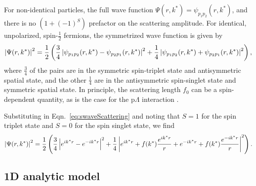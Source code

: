 For non-identical particles, the full wave function $\Psi(r,k^*) = \psi_{p_1p_2}(r,k^*)$, and there is no $(1 + (-1)^S)$ prefactor on the scattering amplitude. 
For identical, unpolarized, spin-$\frac{1}{2}$ fermions, the symmetrized wave function is given by 
\begin{equation}
\label{eq:SymmetrizedWaveFunction}
\left\lvert\Psi(r,k^*)\right\rvert^2 = \frac{1}{2}\left(\frac{3}{4} \left\lvert\psi_{p_1p_2}(r,k^*) - \psi_{p_2p_1}(r,k^*)\right\rvert^2
+ \frac{1}{4} \left\lvert\psi_{p_1p_2}(r,k^*) + \psi_{p_2p_1}(r,k^*)\right\rvert^2\right),
\end{equation}
where $\frac{3}{4}$ of the pairs are in the symmetric spin-triplet state and antisymmetric spatial state, and the other $\frac{1}{4}$ are in the antisymmetric spin-singlet state and symmetric spatial state.
In principle, the scattering length $f_0$ can be a spin-dependent quantity, as is the case for the p$\Lambda$ interaction \cite{Adams:2005ws}.

Substituting in Eqn.\ \ref{eq:swaveScattering} and noting that $S=1$ for the spin triplet state and $S=0$ for the spin singlet state, we find
\begin{equation}
\label{eq:IdenticalUnpolarizedFermionicWaveFunction}
\left\lvert\Psi(r,k^*)\right\rvert^2 = \frac{1}{2}\left(\frac{3}{4} \left\lvert e^{ik^*r} - e^{-ik^*r}\right\rvert^2
+ \frac{1}{4} \left\lvert e^{ik^*r} + f(k^*)\frac{e^{ik^*r}}{r} + e^{-ik^*r} + f(k^*)\frac{e^{-ik^*r}}{r}\right\rvert^2\right).
\end{equation}





\subsection{1D analytic model}
\label{sec:AnalyticModel}

